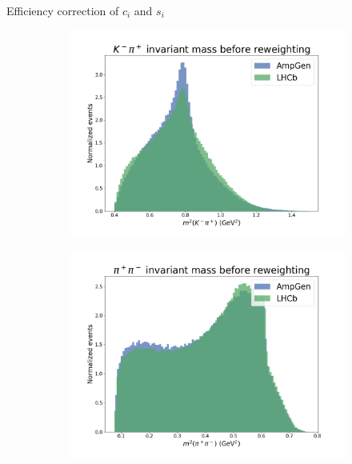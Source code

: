 \documentclass{beamer}
\begin{document}
\begin{frame}{Efficiency correction of $c_i$ and $s_i$}
\begin{figure}
\begin{subfigure}{0.33\textwidth}
      \includegraphics[width = 1.0\textwidth]{Plots/s12_BeforeReweighting.png}
    \end{subfigure}
    \begin{subfigure}{0.33\textwidth}
      \includegraphics[width = 1.0\textwidth]{Plots/s23_BeforeReweighting.png}
    \end{subfigure}%
    \begin{subfigure}{0.33\textwidth}

\end{subfigure}
\end{figure}
\end{frame}
\end{document}

